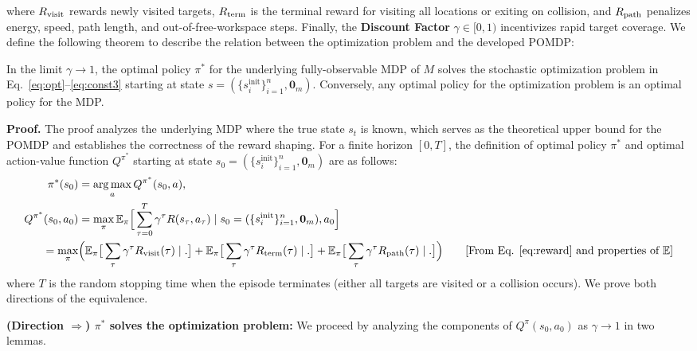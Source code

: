 \documentclass{article}
\begin{document}
where $R_{\mathrm{visit}}$ rewards newly visited targets, $R_{\mathrm{term}}$ is the terminal reward for visiting all locations or exiting on collision, and $R_{\mathrm{path}}$ penalizes energy, speed, path length, and out-of-free-workspace steps. Finally, the \textbf{Discount Factor} $\gamma \in [0,1)$ incentivizes rapid target coverage. We define the following theorem to describe the relation between the optimization problem and the developed POMDP:

\begin{theorem}
\label{thm:optimization}
In the limit $\gamma \to 1$, the optimal policy $\pi^*$ for the underlying fully-observable MDP of $M$ solves the stochastic optimization problem in Eq.~\eqref{eq:opt}--\eqref{eq:const3} starting at state $s = (\{s_i^{\mathrm{init}}\}_{i=1}^n,  \mathbf{0}_m)$. Conversely, any optimal policy for the optimization problem is an optimal policy for the MDP.
\end{theorem}

\textbf{Proof.} The proof analyzes the underlying MDP where the true state $s_t$ is known, which serves as the theoretical upper bound for the POMDP and establishes the correctness of the reward shaping. For a finite horizon $[0,T]$, the definition of optimal policy $\pi^*$ and optimal action-value function $Q^{\pi^*}$ \citep{sutton2018reinforcement} starting at state $s_0 = (\{s_i^{\mathrm{init}}\}_{i=1}^n,  \mathbf{0}_m)$ are as follows:
\begin{align}
    \pi^*(s_0) &= \argmax_a Q^{\pi^*}(s_0, a), \label{eq:opt_pi} \\
    Q^{\pi^*}(s_0, a_0) &= \max_\pi \expectation_\pi \Big[\sum_{\tau=0}^T \gamma^\tau R(s_\tau, a_\tau)  \mid s_0 = (\{s_i^{\mathrm{init}}\}_{i=1}^n,  \mathbf{0}_m) , a_0\Big] \label{eq:opt_policy} \\
    = \max_\pi &\Big( \expectation_\pi \big[ \sum_\tau \gamma^\tau \rvisit(\tau) \mid . \big] + \expectation_\pi \big[ \sum_\tau \gamma^\tau \rterm(\tau) \mid . \big] + \expectation_\pi \big[ \sum_\tau \gamma^\tau \rpath(\tau) \mid . \big] \Big) \tag*{[From Eq. \eqref{eq:reward} and properties of $\mathbb{E}$]}
\end{align}
where $T$ is the random stopping time when the episode terminates (either all targets are visited or a collision occurs). We prove both directions of the equivalence.

\textbf{(Direction $\Rightarrow$) $\pi^*$ solves the optimization problem:}
We proceed by analyzing the components of $Q^\pi(s_0, a_0)$ as $\gamma \to 1$ in two lemmas.
\end{document}
